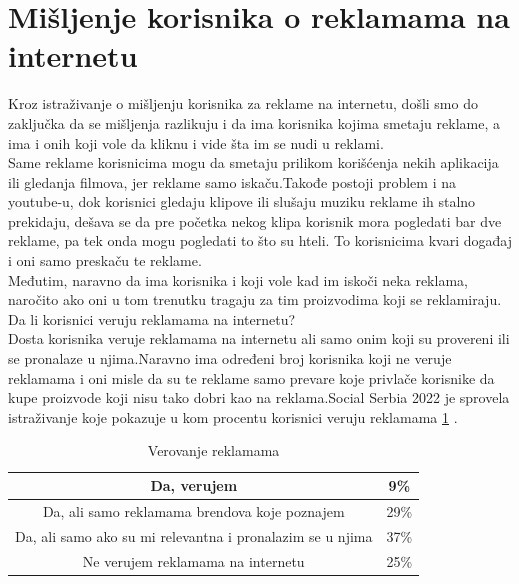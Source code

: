 \documentclass[a4paper]{article}
\begin{document}
	\section{Mišljenje korisnika o reklamama na internetu}
	\label{sec:misljenje}
	Kroz istraživanje o mišljenju korisnika za reklame na internetu, došli smo do zaključka da se mišljenja razlikuju i da ima korisnika kojima smetaju reklame, a ima i onih koji vole da kliknu i vide šta im se nudi u reklami.\\
	Same reklame korisnicima mogu da smetaju prilikom korišćenja nekih aplikacija ili gledanja filmova, jer reklame samo iskaču.Takođe postoji problem i na youtube-u, dok korisnici gledaju klipove ili slušaju muziku reklame ih stalno prekidaju, dešava se da pre početka nekog klipa korisnik mora pogledati bar dve reklame, pa tek onda mogu pogledati to što su hteli. To korisnicima kvari događaj i oni samo preskaču te reklame.\\
	Međutim, naravno da ima korisnika i koji vole kad im iskoči neka reklama, naročito ako oni u tom trenutku tragaju za tim proizvodima koji se reklamiraju.\\
	Da li korisnici veruju reklamama na internetu?\\
	Dosta korisnika veruje reklamama na internetu ali samo onim koji su provereni ili se pronalaze u njima.Naravno ima određeni broj korisnika koji ne veruje reklamama i oni misle da su te reklame samo prevare koje privlače korisnike da kupe proizvode koji nisu tako dobri kao na reklama.Social Serbia 2022 \cite{socialserbia} je sprovela istraživanje koje pokazuje u kom procentu korisnici veruju reklamama \ref{tab:tabela1} .\\
	
	\renewcommand{\tablename}{Tabela}
	\begin{table}[h!]
		\begin{center}
			\caption{Verovanje reklamama}
			\begin{tabular}{|c|c|} \hline
				Da, verujem&9\%\\ \hline
				Da, ali samo reklamama brendova koje poznajem&29\%\\ \hline
				Da, ali samo ako su mi relevantna i pronalazim se u njima&37\%\\ \hline
				Ne verujem reklamama na internetu&25\%\\ \hline
			\end{tabular}
			\label{tab:tabela1}
		\end{center}
	\end{table}\\
	
\end{document}
